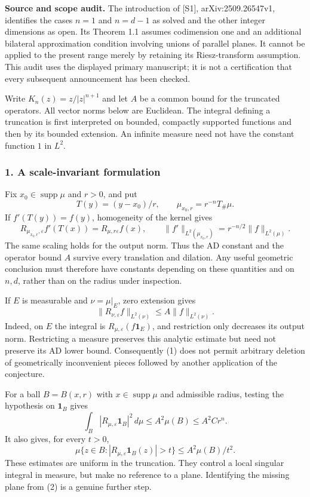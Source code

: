 \documentclass[11pt]{article}
\begin{document}
\textbf{Source and scope audit.} The introduction of [S1], arXiv:2509.26547v1, identifies the cases $n=1$ and $n=d-1$ as solved and the other integer dimensions as open. Its Theorem 1.1 assumes codimension one and an additional bilateral approximation condition involving unions of parallel planes. It cannot be applied to the present range merely by retaining its Riesz-transform assumption. This audit uses the displayed primary manuscript; it is not a certification that every subsequent announcement has been checked.

Write $K_n(z)=z/|z|^{n+1}$ and let $A$ be a common bound for the truncated operators. All vector norms below are Euclidean. The integral defining a truncation is first interpreted on bounded, compactly supported functions and then by its bounded extension. An infinite measure need not have the constant function $1$ in $L^2$.

\subsubsection{1. A scale-invariant formulation}
Fix $x_0\in\operatorname{supp}\mu$ and $r>0$, and put
\[
 T(y)=(y-x_0)/r,\qquad \mu_{x_0,r}=r^{-n}T_\#\mu.
\]
If $f'(T(y))=f(y)$, homogeneity of the kernel gives
\[
 R_{\mu_{x_0,r},\varepsilon}f'(T(x))
 =R_{\mu,r\varepsilon}f(x),\qquad
 \|f'\|_{L^2(\mu_{x_0,r})}=r^{-n/2}\|f\|_{L^2(\mu)}.
\]
The same scaling holds for the output norm. Thus the AD constant and the operator bound $A$ survive every translation and dilation. Any useful geometric conclusion must therefore have constants depending on these quantities and on $n,d$, rather than on the radius under inspection.

If $E$ is measurable and $\nu=\mu|_E$, zero extension gives
\[
 \|R_{\nu,\varepsilon}f\|_{L^2(\nu)}
 \leq A\|f\|_{L^2(\nu)}.                     \tag{1}
\]
Indeed, on $E$ the integral is $R_{\mu,\varepsilon}(f\mathbf1_E)$, and restriction only decreases its output norm. Restricting a measure preserves this analytic estimate but need not preserve its AD lower bound. Consequently (1) does not permit arbitrary deletion of geometrically inconvenient pieces followed by another application of the conjecture.

For a ball $B=B(x,r)$ with $x\in\operatorname{supp}\mu$ and admissible radius, testing the hypothesis on $\mathbf1_B$ gives
\[
 \int_B|R_{\mu,\varepsilon}\mathbf1_B|^2\,d\mu
 \leq A^2\mu(B)\leq A^2 C r^n.              \tag{2}
\]
It also gives, for every $t>0$,
\[
 \mu\{z\in B:|R_{\mu,\varepsilon}\mathbf1_B(z)|>t\}
 \leq A^2\mu(B)/t^2.                       \tag{3}
\]
These estimates are uniform in the truncation. They control a local singular integral in measure, but make no reference to a plane. Identifying the missing plane from (2) is a genuine further step.
\end{document}
